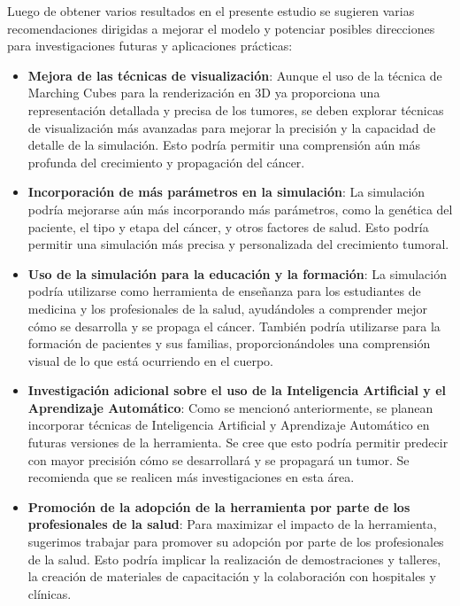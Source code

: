 \documentclass[a4paper,11pt]{article}
\begin{document}
{Luego de obtener varios resultados en el presente estudio se sugieren varias recomendaciones dirigidas a mejorar el modelo y potenciar posibles direcciones para investigaciones futuras y aplicaciones prácticas:
\begin{itemize}
    \item \textbf{Mejora de las técnicas de visualización}: Aunque el uso de la técnica de Marching Cubes para la renderización en 3D ya proporciona una representación detallada y precisa de los tumores, se deben explorar técnicas de visualización más avanzadas para mejorar la precisión y la capacidad de detalle de la simulación. Esto podría permitir una comprensión aún más profunda del crecimiento y propagación del cáncer.
    \item \textbf{Incorporación de más parámetros en la simulación}: La simulación podría mejorarse aún más incorporando más parámetros, como la genética del paciente, el tipo y etapa del cáncer, y otros factores de salud. Esto podría permitir una simulación más precisa y personalizada del crecimiento tumoral.
    \item \textbf{Uso de la simulación para la educación y la formación}: La simulación podría utilizarse como herramienta de enseñanza para los estudiantes de medicina y los profesionales de la salud, ayudándoles a comprender mejor cómo se desarrolla y se propaga el cáncer. También podría utilizarse para la formación de pacientes y sus familias, proporcionándoles una comprensión visual de lo que está ocurriendo en el cuerpo.
    \item \textbf{Investigación adicional sobre el uso de la Inteligencia Artificial y el Aprendizaje Automático}: Como se mencion\'o anteriormente, se planean incorporar técnicas de Inteligencia Artificial y Aprendizaje Automático en futuras versiones de la herramienta. Se cree que esto podría permitir predecir con mayor precisión cómo se desarrollará y se propagará un tumor. Se recomienda que se realicen más investigaciones en esta área.
    \item \textbf{Promoción de la adopción de la herramienta por parte de los profesionales de la salud}: Para maximizar el impacto de la herramienta, sugerimos trabajar para promover su adopción por parte de los profesionales de la salud. Esto podría implicar la realización de demostraciones y talleres, la creación de materiales de capacitación y la colaboración con hospitales y clínicas.
    
\end{itemize}

}
\end{document}
